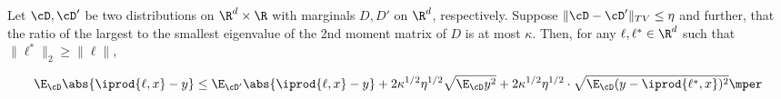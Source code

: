 \begin{lemma}
Let $\cD,\cD'$ be two distributions on $\R^{d} \times \R$ with marginals $D, D'$ on $\R^d$, respectively.
Suppose $\|\cD-\cD'\|_{TV} \leq \eta$ and further, that the ratio of the largest to the smallest eigenvalue of the 2nd moment matrix of $D$ is at most $\kappa$. Then, for any $\ell,\ell^{*} \in \R^d$ such that $\|\ell^{*}\|_2 \geq \|\ell\|$,



\[
\E_{\cD} \abs{\iprod{\ell,x} - y} \leq \E_{\cD'} \abs{\iprod{\ell,x} -y} + 2\kappa^{1/2} \eta^{1/2} \sqrt{\E_{\cD} y^2} + 2 \kappa^{1/2} \eta^{1/2} \cdot \sqrt{\E_{\cD} (y - \iprod{\ell^{*},x})^2}\mper
\]

\end{lemma}


